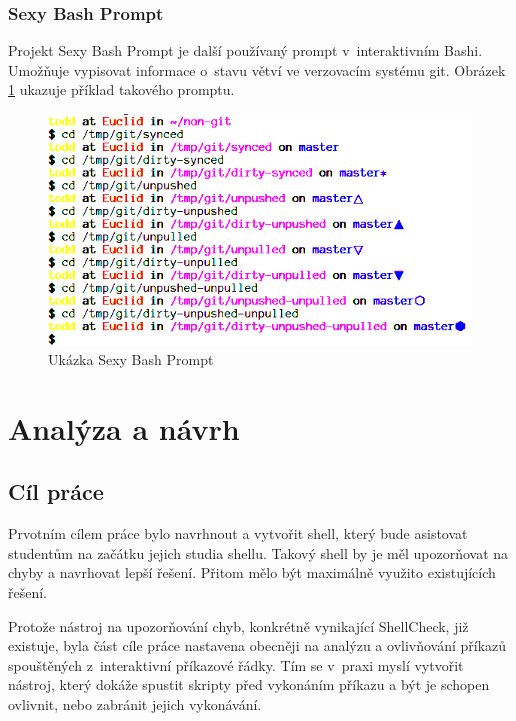 \documentclass[thesis=M,czech]{FITthesis}[2012/06/26]
\begin{document}

\subsection{Sexy Bash Prompt}

Projekt Sexy Bash Prompt \cite{sexybashprompt} je další používaný prompt v~interaktivním Bashi. Umožňuje vypisovat informace o~stavu větví ve verzovacím systému git. Obrázek \ref{fig:sexy_prompt} ukazuje příklad takového promptu.

\begin{figure}[htb]\centering
	\includegraphics[width=\textwidth]{./images/sexy_prompt_edited}
	\caption{Ukázka Sexy Bash Prompt \cite{sexybashprompt}}
	\label{fig:sexy_prompt}
\end{figure}




%
%
%
\chapter{Analýza a návrh}

%
%
%
\section{Cíl práce}

Prvotním cílem práce bylo navrhnout a vytvořit shell, který bude asistovat studentům na začátku jejich studia shellu. Takový shell by je měl upozorňovat na chyby a navrhovat lepší řešení. Přitom mělo být maximálně využito existujících řešení.

Protože nástroj na upozorňování chyb, konkrétně vynikající ShellCheck, již existuje, byla část cíle práce nastavena obecněji na analýzu a ovlivňování příkazů spouštěných z~interaktivní příkazové řádky. Tím se v~praxi myslí vytvořit nástroj, který dokáže spustit skripty před vykonáním příkazu a být je schopen ovlivnit, nebo zabránit jejich vykonávání.
\end{document}
